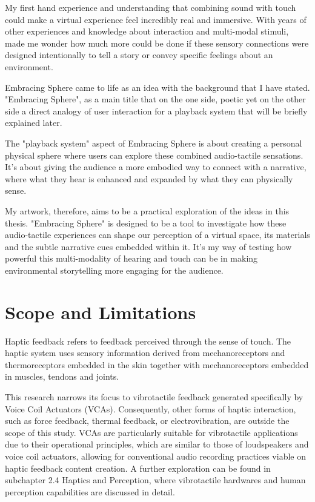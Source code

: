     My first hand experience and understanding that combining sound with touch could make a virtual experience feel incredibly real and immersive. With years of other experiences and knowledge about interaction and multi-modal stimuli, made me wonder how much more could be done if these sensory connections were designed intentionally to tell a story or convey specific feelings about an environment.\par

    Embracing Sphere came to life as an idea with the background that I have stated. "Embracing Sphere", as a main title that on the one side, poetic yet on the other side a direct analogy of user interaction for a playback system that will be briefly explained later.\par
    
    The "playback system" aspect of Embracing Sphere is about creating a personal physical sphere where users can explore these combined audio-tactile sensations. It's about giving the audience a more embodied way to connect with a narrative, where what they hear is enhanced and expanded by what they can physically sense.\par
    
    My artwork, therefore, aims to be a practical exploration of the ideas in this thesis. "Embracing Sphere" is designed to be a tool to investigate how these audio-tactile experiences can shape our perception of a virtual space, its materials and the subtle narrative cues embedded within it. It’s my way of testing how powerful this multi-modality of hearing and touch can be in making environmental storytelling more engaging for the audience.\par

    \section{Scope and Limitations}
    Haptic feedback refers to feedback perceived through the sense of touch. The haptic system uses sensory information derived from mechanoreceptors and thermoreceptors embedded in the skin together with mechanoreceptors embedded in muscles, tendons and joints\cite{Haptic_Perception-A_Tutorial}.\par 

    This research narrows its focus to vibrotactile feedback generated specifically by Voice Coil Actuators (VCAs). Consequently, other forms of haptic interaction, such as force feedback, thermal feedback, or electrovibration, are outside the scope of this study. VCAs are particularly suitable for vibrotactile applications due to their operational principles, which are similar to those of loudspeakers and voice coil actuators\cite{Audio-Tactile_Rendering}, allowing for conventional audio recording practices viable on haptic feedback content creation. A further exploration can be found in subchapter 2.4 Haptics and Perception, where vibrotactile hardwares and human perception capabilities are discussed in detail.\par 

